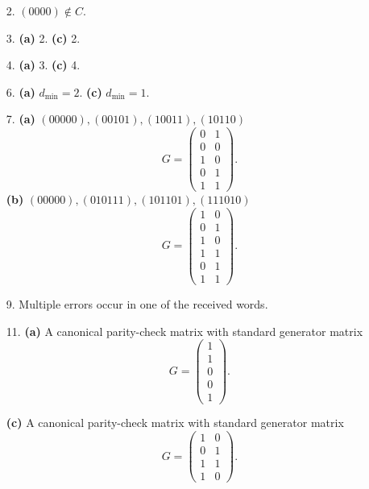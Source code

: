 {\small
\begin{itemize}
 
 
\bf\item[2.]\rm 
$(0000) \notin C$. 
 
\bf\item[3.]\rm 
{\bf (a)} 2. 
{\bf (c)} 2.
 
\bf\item[4.]\rm
{\bf (a)} 3. 
{\bf (c)} 4.
 
 
\bf\item[6.]\rm
{\bf (a)} $d_{\min} = 2$. 
{\bf (c)} $d_{\min} = 1$.
 
 
\bf\item[7.]\rm
{\bf (a)} $(00000), (00101), (10011), (10110)$
\[
G = 
\left(
\begin{array}{cc}
0 & 1 \\
0 & 0 \\
1 & 0 \\
0 & 1 \\
1 & 1
\end{array}
\right).
\]
{\bf (b)} $(00000), (010111), (101101), (111010)$
\[
G = 
\left(
\begin{array}{cc}
1 & 0 \\
0 & 1 \\
1 & 0 \\
1 & 1 \\ 
0 & 1 \\
1 & 1
\end{array}
\right).
\]
 
\bf\item[9.]\rm
Multiple errors occur in one of the received words.
 
 
\bf\item[11.]\rm
{\bf (a)} A canonical parity-check matrix with standard generator
matrix
\[
G = 
\left(
\begin{array}{c}
1 \\ 1 \\ 0 \\ 0 \\ 1
\end{array}
\right).
\]

{\bf (c)}
A canonical parity-check matrix with standard generator
matrix
\[
G = 
\left(
\begin{array}{cc}
1 & 0 \\
0 & 1 \\
1 & 1 \\
1 & 0
\end{array}
\right).
\]


\end{itemize}}
